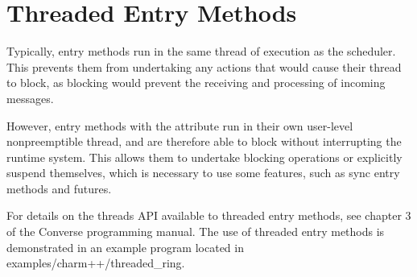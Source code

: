 \section{Threaded Entry Methods}
\label{threaded}

Typically, entry methods run in the same thread of execution as the \charmpp
scheduler. This prevents them from undertaking any actions that would cause
their thread to block, as blocking would prevent the receiving and processing of
incoming messages.

However, entry methods with the  attribute run in their own
user-level nonpreemptible thread, and are therefore able to block without
interrupting the runtime system. This allows them to undertake blocking
operations or explicitly suspend themselves, which is necessary to use some
\charmpp features, such as sync entry methods and futures.

For details on the threads API available to threaded entry methods, see chapter
3 of the Converse programming manual. The use of threaded entry methods is
demonstrated in an example program located in examples/charm++/threaded\_ring.
